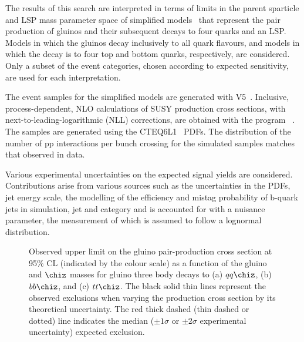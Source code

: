 The results of this search are interpreted in terms of limits in the
parent sparticle and LSP mass parameter space of simplified
models~\cite{Alwall:2008ag, Alwall:2008va, sms} that represent the pair production of gluinos and their subsequent decays to four quarks 
and an LSP. Models in which the gluinos decay inclusively to all quark flavours, and models in which the decay is to four top and bottom quarks, respectively, are considered. 
%
Only a subset of the event categories, chosen according to expected sensitivity, are used for
each interpretation.

The event samples for the simplified models are generated 
with \MADGRAPH V5~\cite{madgraph}.
Inclusive, process-dependent, NLO
calculations of SUSY production cross sections, with
next-to-leading-logarithmic (NLL) corrections, are obtained with the
program \PROSPINO~\cite{Beenakker:1996ch, PhysRevD.80.095004,PhysRevLett.102.111802, PhysRevD.80.095004, 1126-6708-2009-12-041,
  doi:10.1142/S0217751X11053560, susy-nlo-nll}. The samples are
generated using the CTEQ6L1~\cite{Pumplin:2002vw} PDFs. The
distribution of the number of pp interactions per bunch crossing for
the simulated samples matches that observed in data.

Various experimental uncertainties on the expected signal yields are
considered. Contributions arise from
various sources such as the uncertainties in the PDFs, jet energy
scale, the modelling of the efficiency and mistag probability of
b-quark jets in simulation, jet and \nb category
and is accounted for with a nuisance parameter, the measurement 
of which is assumed to follow a lognormal distribution.

\begin{figure*}[tbhp]

  \begin{center}
    \caption{Observed upper limit on the gluino pair-production cross section at 95\% CL (indicated by the colour scale) as a function of the gluino
      and $\chiz$ masses for gluino three body decays to (a) $qq\chiz$, (b) $bb\chiz$, and (c) $tt\chiz$.
      The black solid thin lines represent the observed exclusions when
      varying the production cross section by its theoretical uncertainty. 
      The red thick dashed (thin dashed
      or dotted) line indicates the median (${\pm}1 \sigma$ or ${\pm}2
      \sigma$ experimental uncertainty) expected exclusion.
      \label{fig:limits-sms} }
  \end{center}
\end{figure*}


